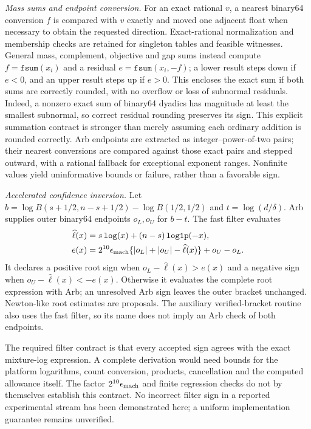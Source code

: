 \documentclass[10pt]{article}
\begin{document}
\emph{Mass sums and endpoint conversion.} For an exact rational $v$, a nearest binary64 conversion $f$ is compared with $v$ exactly and moved one adjacent float when necessary to obtain the requested direction. Exact-rational normalization and membership checks are retained for singleton tables and feasible witnesses. General mass, complement, objective and gap sums instead compute $f=\texttt{fsum}(x_i)$ and a residual $e=\texttt{fsum}(x_i,-f)$; a lower result steps down if $e<0$, and an upper result steps up if $e>0$. This encloses the exact sum if both sums are correctly rounded, with no overflow or loss of subnormal residuals. Indeed, a nonzero exact sum of binary64 dyadics has magnitude at least the smallest subnormal, so correct residual rounding preserves its sign. This explicit summation contract is stronger than merely assuming each ordinary addition is rounded correctly. Arb endpoints are extracted as integer--power-of-two pairs; their nearest conversions are compared against those exact pairs and stepped outward, with a rational fallback for exceptional exponent ranges. Nonfinite values yield uninformative bounds or failure, rather than a favorable sign.

\emph{Accelerated confidence inversion.} Let $b=\log B(s+1/2,n-s+1/2)-\log B(1/2,1/2)$ and $t=\log(d/\delta)$. Arb supplies outer binary64 endpoints $o_L,o_U$ for $b-t$. The fast filter evaluates
\begin{align}
 \widehat\ell(x)&=s\,\texttt{log}(x)+(n-s)\,\texttt{log1p}(-x),\\
 e(x)&=2^{10}\epsilon_{\rm mach}
       \{|o_L|+|o_U|-\widehat\ell(x)\}+o_U-o_L.
\end{align}
It declares a positive root sign when $o_L-\widehat\ell(x)>e(x)$ and a negative sign when $o_U-\widehat\ell(x)<-e(x)$. Otherwise it evaluates the complete root expression with Arb; an unresolved Arb sign leaves the outer bracket unchanged. Newton-like root estimates are proposals. The auxiliary verified-bracket routine also uses the fast filter, so its name does not imply an Arb check of both endpoints.

The required filter contract is that every accepted sign agrees with the exact mixture-log expression. A complete derivation would need bounds for the platform logarithms, count conversion, products, cancellation and the computed allowance itself. The factor $2^{10}\epsilon_{\rm mach}$ and finite regression checks do not by themselves establish this contract. No incorrect filter sign in a reported experimental stream has been demonstrated here; a uniform implementation guarantee remains unverified.
\end{document}
